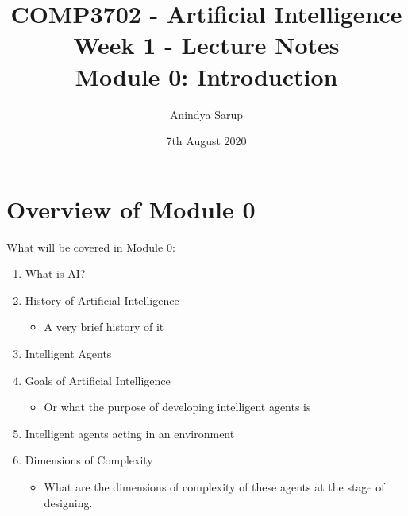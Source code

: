 \documentclass[12pt]{article}
\title{%
    COMP3702 - Artificial Intelligence \\
        Week 1 - Lecture Notes \\
        Module 0: Introduction}
\author{Anindya Sarup}
\date{7th August 2020}
\begin{document}
\maketitle

\section*{Overview of Module 0}

What will be covered in Module 0:
\begin{enumerate}
    \item What is AI?
    \item History of Artificial Intelligence
    \begin{itemize}
        \item A very brief history of it
    \end{itemize}
    \item Intelligent Agents
    \item Goals of Artificial Intelligence
    \begin{itemize}
        \item Or what the purpose of developing intelligent agents is
    \end{itemize}
    \item Intelligent agents acting in an environment
    \item Dimensions of Complexity
    \begin{itemize}
        \item What are the dimensions of complexity of these agents at the stage of designing.
    \end{itemize}
\end{enumerate}

\newpage

\tableofcontents

\newpage
\end{document}
